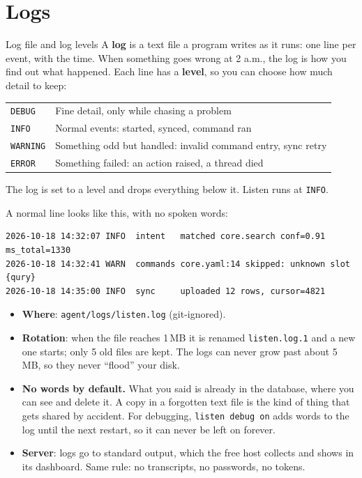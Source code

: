 \documentclass[11pt,a4paper]{article}
\begin{document}
\section{Logs}

\begin{concept}{Log file and log levels}
A \textbf{log} is a text file a program writes as it runs: one line per event, with the time.
When something goes wrong at 2 a.m., the log is how you find out what happened. Each line has a
\textbf{level}, so you can choose how much detail to keep:
\begin{center}
\begin{tabular}{l l}
\texttt{DEBUG}   & Fine detail, only while chasing a problem \\
\texttt{INFO}    & Normal events: started, synced, command ran \\
\texttt{WARNING} & Something odd but handled: invalid command entry, sync retry \\
\texttt{ERROR}   & Something failed: an action raised, a thread died \\
\end{tabular}
\end{center}
The log is set to a level and drops everything below it. Listen runs at \texttt{INFO}.
\end{concept}

\noindent A normal line looks like this, with no spoken words:
\begin{lstlisting}
2026-10-18 14:32:07 INFO  intent   matched core.search conf=0.91 ms_total=1330
2026-10-18 14:32:41 WARN  commands core.yaml:14 skipped: unknown slot {qury}
2026-10-18 14:35:00 INFO  sync     uploaded 12 rows, cursor=4821
\end{lstlisting}

\begin{itemize}[nosep]
  \item \textbf{Where}: \texttt{agent/logs/listen.log} (git-ignored).
  \item \textbf{Rotation}: when the file reaches 1\,MB it is renamed \texttt{listen.log.1} and a
        new one starts; only 5 old files are kept. The logs can never grow past about 5\,MB, so
        they never ``flood'' your disk.
  \item \textbf{No words by default.} What you said is already in the database, where you can
        see and delete it. A copy in a forgotten text file is the kind of thing that gets shared
        by accident. For debugging, \texttt{listen debug on} adds words to the log until the
        next restart, so it can never be left on forever.
  \item \textbf{Server}: logs go to standard output, which the free host collects and shows in its
        dashboard. Same rule: no transcripts, no passwords, no tokens.
\end{itemize}
\end{document}
